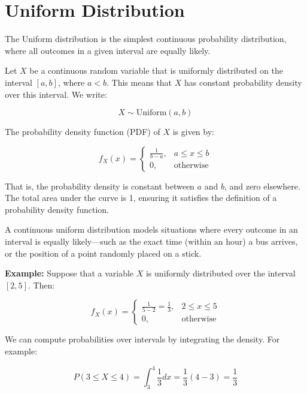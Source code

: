 \documentclass[twoside]{book}
\begin{document}

\section{Uniform Distribution}

The Uniform distribution is the simplest continuous probability distribution, where all outcomes in a given interval are equally likely.

Let $X$ be a continuous random variable that is uniformly distributed on the interval $[a, b]$, where $a < b$. This means that $X$ has constant probability density over this interval. We write:

\[
X \sim \text{Uniform}(a, b)
\]

The probability density function (PDF) of $X$ is given by:

\begin{textbox}
\[
f_X(x) =
\begin{cases}
\frac{1}{b - a}, & a \le x \le b \\
0, & \text{otherwise}
\end{cases}
\]
\end{textbox}

That is, the probability density is constant between $a$ and $b$, and zero elsewhere. The total area under the curve is 1, ensuring it satisfies the definition of a probability density function.

A continuous uniform distribution models situations where every outcome in an interval is equally likely—such as the exact time (within an hour) a bus arrives, or the position of a point randomly placed on a stick.

\vspace{2mm}
\textbf{Example:} Suppose that a variable $X$ is uniformly distributed over the interval $[2, 5]$. Then:

\[
f_X(x) =
\begin{cases}
\frac{1}{5 - 2} = \frac{1}{3}, & 2 \le x \le 5 \\
0, & \text{otherwise}
\end{cases}
\]

We can compute probabilities over intervals by integrating the density. For example:

\[
P(3 \le X \le 4) = \int_{3}^{4} \frac{1}{3} dx = \frac{1}{3}(4 - 3) = \frac{1}{3}
\]
\end{document}

